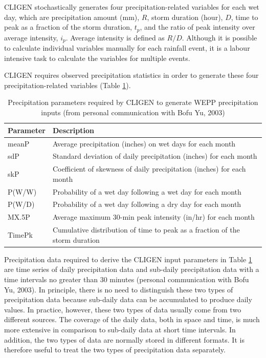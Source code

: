 CLIGEN stochastically generates four precipitation-related variables for each
wet day, which are precipitation amount  (mm), $R$, storm duration (hour), $D$,
time to peak as a fraction of the storm duration, $t_p$, and the ratio of peak
intensity over average intensity, $i_p$. Average intensity is defined as $R/D$.
Although it is possible to calculate individual variables manually for each
rainfall event, it is a labour intensive task to calculate the variables for
multiple events.

CLIGEN requires observed precipitation statistics in order to generate these
four precipitation-related variables (Table
\ref{tab:PrecipitaionParametersRequiredByCLIGEN}).

\begin{table}[htbp]
  \centering
  \caption[Precipitation parameters required by CLIGEN]{Precipitation
parameters required by CLIGEN to generate WEPP precipitation inputs (from
personal communication with Bofu Yu, 2003)}
  \label{tab:PrecipitaionParametersRequiredByCLIGEN}
  \footnotesize
    \begin{tabular}{ll}
    \toprule
    \textbf{Parameter} & \textbf{Description} \\
    \midrule
    meanP & Average precipitation (inches) on wet days for each
month\\
    sdP & Standard deviation of daily precipitation (inches) for
each month\\
    skP & Coefficient of skewness of daily precipitation (inches)
for each month\\
    P(W/W) & Probability of a wet day following a wet day for each
month\\
    P(W/D) & Probability of a wet day following a dry day for each
month\\
    {MX.5P} & Average maximum 30-min peak intensity (in/hr) for each
month\\
    TimePk & Cumulative distribution of time to peak as a fraction
of the storm duration\\
    \bottomrule
    \end{tabular}
\end{table}

Precipitation data required to derive the CLIGEN input parameters in Table
\ref{tab:PrecipitaionParametersRequiredByCLIGEN} are time series of daily
precipitation data and sub-daily precipitation data with a time intervals no
greater than 30 minutes (personal communication with Bofu Yu, 2003). In
principle, there is no need to distinguish these two types of precipitation data
because sub-daily data can be accumulated to produce daily values. In practice,
however, these two types of data usually come from two different sources. The
coverage of the daily data, both in space and time, is much more extensive in
comparison to sub-daily data at short time intervals. In addition, the two types
of data are normally stored in different formats. It is therefore useful to
treat the two types of precipitation data separately.

